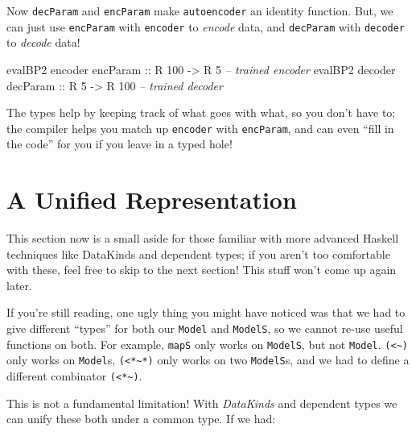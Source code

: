 \documentclass[]{article}
\newenvironment{Shaded}{}{}
\newcommand{\CommentTok}[1]{\textcolor[rgb]{0.38,0.63,0.69}{\textit{#1}}}
\newcommand{\DataTypeTok}[1]{\textcolor[rgb]{0.56,0.13,0.00}{#1}}
\newcommand{\DecValTok}[1]{\textcolor[rgb]{0.25,0.63,0.44}{#1}}
\newcommand{\NormalTok}[1]{#1}
\newcommand{\OtherTok}[1]{\textcolor[rgb]{0.00,0.44,0.13}{#1}}
\begin{document}
Now \texttt{decParam} and \texttt{encParam} make \texttt{autoencoder} an
identity function. But, we can just use \texttt{encParam} with \texttt{encoder}
to \emph{encode} data, and \texttt{decParam} with \texttt{decoder} to
\emph{decode} data!

\begin{Shaded}
\begin{Highlighting}[]
\NormalTok{evalBP2 encoder}\OtherTok{ encParam ::} \DataTypeTok{R} \DecValTok{100} \OtherTok{->} \DataTypeTok{R} \DecValTok{5}        \CommentTok{-- trained encoder}
\NormalTok{evalBP2 decoder}\OtherTok{ decParam ::} \DataTypeTok{R} \DecValTok{5}   \OtherTok{->} \DataTypeTok{R} \DecValTok{100}      \CommentTok{-- trained decoder}
\end{Highlighting}
\end{Shaded}

The types help by keeping track of what goes with what, so you don't have to;
the compiler helps you match up \texttt{encoder} with \texttt{encParam}, and can
even ``fill in the code'' for you if you leave in a typed hole!

\hypertarget{a-unified-representation}{%
\section{A Unified Representation}\label{a-unified-representation}}

This section now is a small aside for those familiar with more advanced Haskell
techniques like DataKinds and dependent types; if you aren't too comfortable
with these, feel free to skip to the next section! This stuff won't come up
again later.

If you're still reading, one ugly thing you might have noticed was that we had
to give different ``types'' for both our \texttt{Model} and \texttt{ModelS}, so
we cannot re-use useful functions on both. For example, \texttt{mapS} only works
on \texttt{ModelS}, but not \texttt{Model}.
\texttt{(\textless{}\textasciitilde{})} only works on \texttt{Model}s,
\texttt{(\textless{}*\textasciitilde{}*)} only works on two \texttt{ModelS}s,
and we had to define a different combinator
\texttt{(\textless{}*\textasciitilde{})}.

This is not a fundamental limitation! With \emph{DataKinds} and dependent types
we can unify these both under a common type. If we had:
\end{document}
